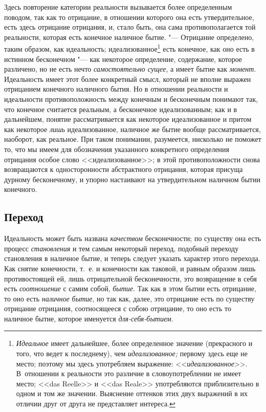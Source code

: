 Здесь повторение категории реальности вызывается более определенным поводом,
так как то отрицание, в отношении которого она есть утвердительное, есть
здесь отрицание отрицания, и, стало быть, она сама противополагается той
реальности, которая есть конечное наличное бытие. "--- Отрицание определено,
таким образом, как идеальность; идеализованное\footnote{{\em Идеальное}
имеет дальнейшее, более определенное значение (прекрасного и
того, что ведет к последнему), чем {\em идеализованное;} первому здесь еще
не место; поэтому мы здесь употребляем выражение: <<{\em идеализованное}>>.
В~отношении к реальности это различие в словоупотреблении не имеет место;
<<das Reelle>> и <<das Reale>> употребляются приблизительно в одном и том же
значении. Выяснение оттенков этих двух выражений в их отличии друг от друга
не представляет интереса.} есть конечное, как оно есть в истинном
бесконечном "--- как некоторое определение, содержание, которое различено, но
не есть нечто {\em самостоятельно сущее}, а имеет бытие
как {\em момент}. Идеальность имеет этот более
конкретный смысл, который не вполне выражен отрицанием конечного наличного
бытия. Но в отношении реальности и идеальности противоположность между
конечным и бесконечным понимают так, что конечное считается реальным, а
бесконечное идеализованным; как и в дальнейшем, понятие рассматривается как
некоторое идеализованное и притом как некоторое
{\em лишь} идеализованное, наличное же бытие вообще
рассматривается, наоборот, как реальное. При таком понимании, разумеется,
нисколько не поможет то, что мы имеем для обозначения указанного
конкретного определения отрицания особое слово <<идеализованное>>; в этой
противоположности снова возвращаются к односторонности абстрактного
отрицания, которая присуща дурному бесконечному, и упорно настаивают на
утвердительном наличном бытии конечного.

\subsection[Переход]{Переход}

Идеальность может быть названа {\em качеством}
бесконечности; по существу она есть процесс
{\em становления} и тем самым некоторый переход,
подобный переходу становления в наличное бытие, и теперь следует указать
характер этого перехода. Как снятие конечности, т.~е. и конечности как
таковой, и равным образом лишь противостоящей ей, лишь отрицательной
бесконечности, это возвращение в себя есть {\em соотношение} с самим собой,
{\em бытие}. Так как в этом бытии есть отрицание, то
оно есть {\em наличное бытие}, но так как, далее, это отрицание есть
по существу отрицание отрицания, соотносящееся с собою отрицание, то
оно есть то наличное бытие, которое именуется {\em для-себя-бытием}.

